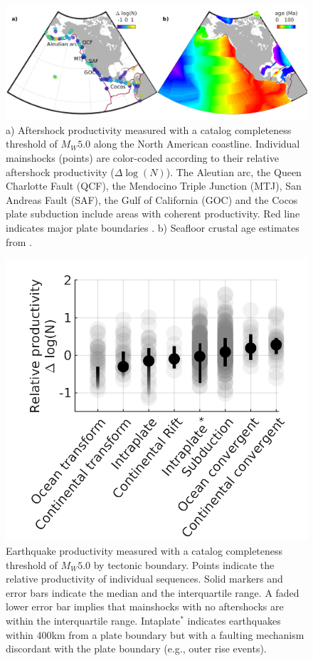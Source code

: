 \documentclass[draft]{agujournal}
\begin{document}
\begin{figure}[H]
\centering
\includegraphics[width=\linewidth]{figures/regions_mw5.png}
\caption{a) Aftershock productivity measured with a catalog completeness threshold of $M_W5.0$ along the North American coastline.  Individual mainshocks (points) are color-coded according to their relative aftershock productivity ($\Delta \log(N)$). The Aleutian arc, the Queen Charlotte Fault (QCF), the Mendocino Triple Junction (MTJ), San Andreas Fault (SAF), the Gulf of California (GOC) and the Cocos plate subduction include areas with coherent productivity. Red line indicates major plate boundaries \citep{Bird2003AnBoundaries}. b) Seafloor crustal age estimates from \citet{Muller2008}.}
\label{fig:region}
\end{figure}  

\begin{figure}[H]
\centering
\includegraphics{figures/prod_by_pb_mw5.png}
\caption{Earthquake productivity measured with a catalog completeness threshold of $M_W5.0$ by tectonic boundary. Points indicate the relative productivity of individual sequences. Solid markers and error bars indicate the median and the interquartile range. A faded lower error bar implies that mainshocks with no aftershocks are within the interquartile range. Intaplate$^*$ indicates earthquakes within 400km from a plate boundary but with a faulting mechanism discordant with the plate boundary (e.g., outer rise events).}
\label{fig:plate_boundary}
\end{figure}    
\end{document}
